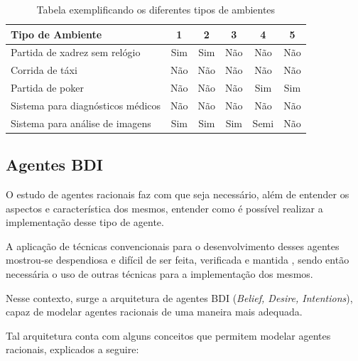 \begin{table}[htb]
    \begin{center}
        \caption{\label{tab:ENVEXAMPLETABLE} Tabela exemplificando os
        diferentes tipos de ambientes}
        \begin{tabular}{| l | c | c | c | c | c |} \hline
            \textbf{Tipo de Ambiente}         & \textbf{1} & \textbf{2} & \textbf{3} & \textbf{4} & \textbf{5} \\ \hline
            Partida de xadrez sem relógio     & Sim        & Sim        & Não        & Não        & Não        \\ \hline
            Corrida de táxi                   & Não        & Não        & Não        & Não        & Não        \\ \hline
            Partida de poker                  & Não        & Não        & Não        & Sim        & Sim        \\ \hline
            Sistema para diagnósticos médicos & Não        & Não        & Não        & Não        & Não        \\ \hline
            Sistema para análise de imagens   & Sim        & Sim        & Sim        & Semi       & Não        \\ \hline
        \end{tabular}
    \end{center}
\end{table}

\subsection{Agentes BDI}

O estudo de agentes racionais faz com que seja necessário, além de entender os
aspectos e característica dos mesmos, entender como é possível realizar a
implementação desse tipo de agente.

A aplicação de técnicas convencionais para o desenvolvimento desses agentes
mostrou-se despendiosa e difícil de ser feita, verificada e mantida
\cite{BDIFROMTHEORYTOPRACTICE}, sendo então necessária o uso de outras técnicas
para a implementação dos mesmos.

Nesse contexto, surge a arquitetura de agentes BDI (\textit{Belief, Desire,
Intentions}), capaz de modelar agentes racionais de uma maneira mais adequada.

Tal arquitetura conta com alguns conceitos que permitem modelar agentes
racionais, explicados a seguire:

